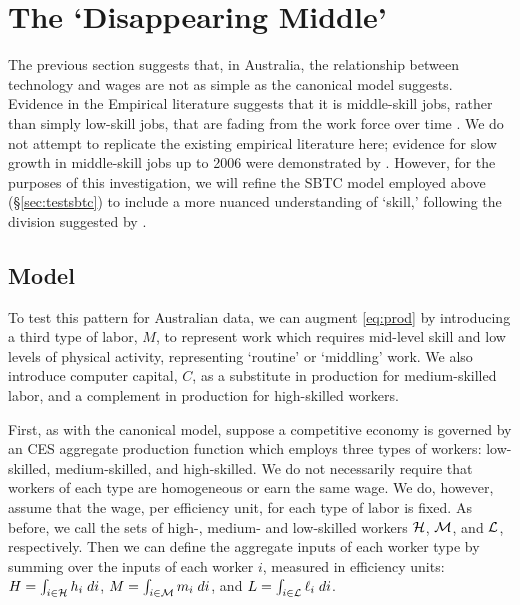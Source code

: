 \section{The `Disappearing Middle'}\label{sec:disappearing}

The previous section suggests that, in Australia, the relationship between technology and wages are not as simple as the canonical model suggests. Evidence in the Empirical literature suggests that it is middle-skill jobs, rather than simply low-skill jobs, that are fading from the work force over time \citep[e.g.][]{Harding1997,Cully1999,Esposto2012}. We do not attempt to replicate the existing empirical literature here; evidence for slow growth in middle-skill jobs up to 2006 were demonstrated by \citep{Esposto2012}. However, for the purposes of this investigation, we will refine the SBTC model employed above (\S\ref{sec:testsbtc}) to include a more nuanced understanding of `skill,' following the division suggested by \citet{Levy2003}.

\subsection{Model}

To test this pattern for Australian data, we can augment \eqref{eq:prod} by introducing a third type of labor, $M$, to represent work which requires mid-level skill and low levels of physical activity, representing `routine' or `middling' work. We also introduce computer capital, $C$, as a substitute in production for medium-skilled labor, and a complement in production for high-skilled workers.

First, as with the canonical model, suppose a competitive economy is governed by an CES aggregate production function which employs three types of workers: low-skilled, medium-skilled, and high-skilled. We do not necessarily require that workers of each type are homogeneous or earn the same wage. We do, however, assume that the wage, per efficiency unit, for each type of labor is fixed. As before, we call the sets of high-, medium- and low-skilled workers $\mathcal{H}$, $\mathcal{M}$, and $\mathcal{L}$, respectively. Then we can define the aggregate inputs of each worker type by summing over the inputs of each worker $i$, measured in efficiency units: ${H = \int_{i\in\mathcal{H}}h_i\;di}$, ${M = \int_{i\in\mathcal{M}}m_i\;di}$, and ${L = \int_{i\in\mathcal{L}}\ell_i\;di}$.

